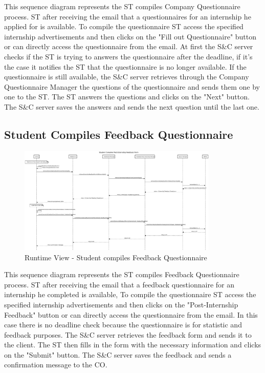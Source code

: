 \par This sequence diagram represents the ST compiles Company Questionnaire process. ST after receiving the email that
a questionnaires for an internship he applied for is available. To compile the questionnaire ST access the specified internship
advertisements and then clicks on the "Fill out Questionnaire" button or can directly access the questionnaire from the email.
At first the S\&C server checks if the ST is trying to answers the questionnaire after the deadline, if it's the case it notifies
the ST that the questionnaire is no longer available. If the questionnaire is still available, the S\&C server retrieves through
the Company Questionnaire Manager the questions of the questionnaire and sends them one by one to the ST.
The ST answers the questions and clicks on the "Next" button. The S\&C server saves the answers and sends the next question
until the last one.


\subsection{Student Compiles Feedback Questionnaire}
\label{sub:student-compiles-feedback-questionnaire}%

\begin{figure}[H]
      \centering
      \includegraphics[width=0.85\textwidth]{Images/RV_04b.pdf}
      \caption{Runtime View - Student compiles Feedback Questionnaire}
      \label{fig:rv-student-compiles-feedback-questionnaire}
\end{figure}

\par This sequence diagram represents the ST compiles Feedback Questionnaire process. ST after receiving the email that
a feedback questionnaire for an internship he completed is available, To compile the questionnaire ST access the specified internship
advertisements and then clicks on the "Post-Internship Feedback" button or can directly access the questionnaire from the email.
In this case there is no deadline check because the questionnaire is for statistic and feedback purposes. The S\&C server retrieves
the feedback form and sends it to the client. The ST then fills in the form with the necessary information and clicks on the
"Submit" button. The S\&C server saves the feedback and sends a confirmation message to the CO.

